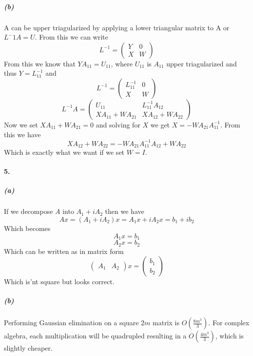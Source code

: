 \documentclass[12pt]{article}
\begin{document}
	\subparagraph{(b)}
		A can be upper triagularized by applying a lower triangular matrix to A or $L^-1A = U$. From this we can write 
		\[
		L^{-1} =
		\left(\begin{matrix}
		Y & 0 \\
		X & W
		\end{matrix}\right)
		\]
		From this we know that $YA_{11} = U_{11}$, where $U_{11}$ is $A_{11}$ upper triagularized and thus $Y = L_{11}^{-1}$ and 
		\[
		L^{-1} =
		\left(\begin{matrix}
		L_{11}^{-1} & 0 \\
		X & W
		\end{matrix}\right)
		\]
		\[
		L^{-1}A = 
		\left(\begin{matrix}
		U_{11} & L_{11}^{-1}A_{12} \\
		XA_{11} + WA_{21} & XA_{12} + WA_{22}
		\end{matrix}\right)
		\]
		Now we set $XA_{11} + WA_{21} = 0$ and solving for $X$ we get $ X = -WA_{21}A_{11}^{-1}$. From this we have
		\[
		XA_{12} + WA_{22} = -WA_{21}A_{11}^{-1}A_{12} + WA_{22}
		\]
		Which is exactly what we want if we set $W = I$.
		
\paragraph{5.}
	\subparagraph{(a)}
		If we decompose $A$ into $A_1 + iA_2$ then we have 
		\[
		Ax = (A_1 + iA_2)x = A_1x + iA_2x = b_1 + ib_2
		\]
		Which becomes 
		\[
		A_1x = b_1
		\]
		\[
		A_2x = b_2
		\]
		Which can be written as in matrix form
		\[
		\left(\begin{matrix}
		A_1 & A_2 
		\end{matrix}\right)
		x
		= 
		\left(\begin{matrix}
		b_1 \\
		b_2
		\end{matrix}\right)
		\]
		Which is'nt square but looks correct.
		
	\subparagraph{(b)}
		Performing Gaussian elimination on a square $2m$ matrix is $O(\frac{8m^3}{3})$. For complex algebra, each multiplication will be quadrupled resulting in a $O(\frac{4m^3}{3})$, which is slightly cheaper.
	
\end{document}
